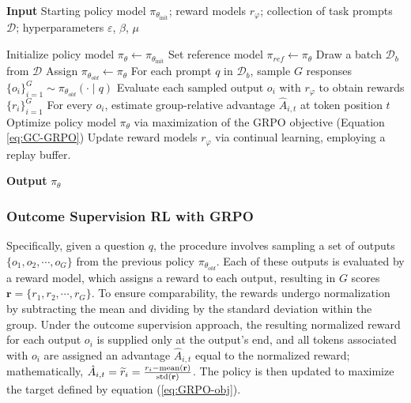 \begin{itemize}[topsep=0pt]
\begin{itemize}[topsep=0pt]
\begin{algorithm}[t]
  \small
  \caption{Iterative Group Relative Policy Optimization}
  \textbf{Input} Starting policy model $\pi_{\theta_{\text{init}}}$; reward models $r_\varphi$; collection of task prompts $\mathcal{D}$; 
  hyperparameters $\varepsilon$, $\beta$, $\mu$
  \begin{algorithmic}[1]
    \State Initialize policy model $\pi_\theta \leftarrow \pi_{\theta_{\text{init}}}$
       \State Set reference model $\pi_{ref} \leftarrow \pi_{\theta}$
      \State Draw a batch $\mathcal{D}_b$ from $\mathcal{D}$
      \State Assign $\pi_{\theta_{old}} \leftarrow \pi_{\theta}$
      \State For each prompt $q$ in $\mathcal{D}_b$, sample $G$ responses $\{o_i\}_{i=1}^G \sim \pi_{\theta_{old}} (\cdot \mid q) $
      \State Evaluate each sampled output $o_i$ with $r_{\varphi}$ to obtain rewards $\{r_i\}_{i=1}^{G}$
      \State For every $o_i$, estimate group-relative advantage $\hat{A}_{i,t}$ at token position $t$
        \State Optimize policy model $\pi_{\theta}$ via maximization of the GRPO objective (Equation \ref{eq:GC-GRPO})
      \EndFor
    \EndFor \State Update reward models $r_\varphi$ via continual learning, employing a replay buffer.
    \EndFor 
  \end{algorithmic}
  \textbf{Output} $\pi_\theta$
  \label{alg:iter-grpo}
\end{algorithm}

\subsubsection{Outcome Supervision RL with GRPO} Specifically, given a question $q$, the procedure involves sampling a set of outputs $\{o_1, o_2, \cdots, o_G\}$ from the previous policy $\pi_{\theta_{old}}$. Each of these outputs is evaluated by a reward model, which assigns a reward to each output, resulting in $G$ scores $\mathbf{r}=\{r_1, r_2, \cdots, r_G\}$. To ensure comparability, the rewards undergo normalization by subtracting the mean and dividing by the standard deviation within the group. Under the outcome supervision approach, the resulting normalized reward for each output $o_i$ is supplied only at the output's end, and all tokens associated with $o_i$ are assigned an advantage $\hat{A}_{i, t}$ equal to the normalized reward; mathematically, $\hat{A}_{i, t} = \widetilde{r}_i = \frac{r_i- {\rm mean}(\mathbf{r})}{{\rm std}(\mathbf{r})}$. The policy is then updated to maximize the target defined by equation (\ref{eq:GRPO-obj}).


\end{itemize}
\end{itemize}
